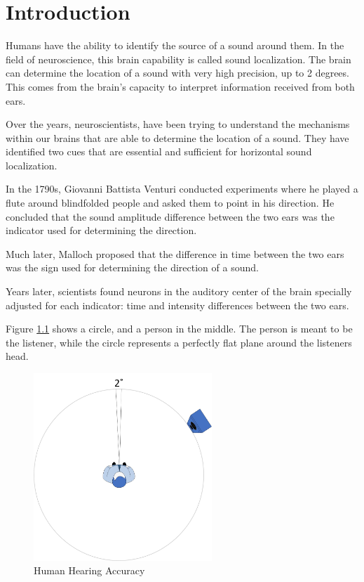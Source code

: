 \chapter{Introduction}\label{ch:introduction}
Humans have the ability to identify the source of a sound around them. In the 
field of neuroscience, this brain capability is called sound localization. The brain
can determine the location of a sound with very high precision, up to 2 degrees. 
This comes from the brain's capacity to interpret information received
from both ears.

Over the years, neuroscientists, have been trying to understand the mechanisms 
within our brains that are able to determine the location of a sound. They have 
identified two cues that are essential and sufficient for horizontal sound
localization.

In the 1790s, Giovanni Battista Venturi conducted experiments where he played a 
flute around blindfolded people and asked them to point in his direction. 
He concluded that the sound amplitude difference between the two ears was the 
indicator used for determining the direction.

Much later, Malloch proposed that the difference in time between the two ears 
was the sign used for determining the direction of a sound.

Years later, scientists found neurons in the auditory center of the brain
specially adjusted for each indicator: time and intensity differences between 
the two ears.

\newpage

Figure \ref{fig:humanHearingAccuracy} shows a circle, and a person in the middle. 
The person is meant to be the listener, while the circle represents a perfectly 
flat plane around the listeners head.
 
\begin{figure}[htp]
	\centering
	\includegraphics[width = 0.6\textwidth]{Illustrations/personHearingAccuracy.jpg}
	\caption{Human Hearing Accuracy}
	\label{fig:humanHearingAccuracy}
\end{figure}

